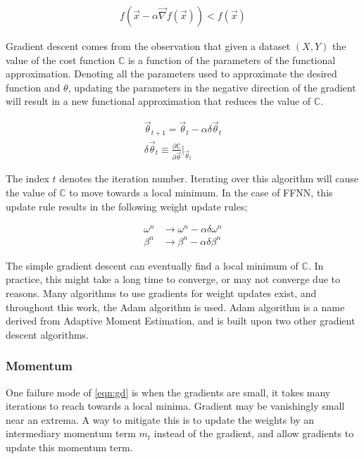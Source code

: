 \documentclass[../dissertation.tex]{subfiles}
\begin{document}
\begin{align}
    f\left(\vec{x} - \alpha \vec{\nabla} f(\vec{x}) \right) < f(\vec{x})
\end{align}

Gradient descent comes from the observation that given a dataset $(X, Y)$ the value of the cost function $\mathbb{C}$ is a function of the parameters of the functional approximation.
Denoting all the parameters used to approximate the desired function and $\theta$, updating the parameters in the negative direction of the gradient will result in a new functional approximation that reduces the value of $\mathbb{C}$.

\begin{align}
    \label{eqn:gd}
    \vec{\theta}_{t+1} = \vec{\theta}_t  - \alpha \delta \vec{\theta}_t \\
    \delta \vec{\theta}_t \equiv \frac{\partial \mathbb{C}}{\partial \vec{\theta}} \rvert_{\vec{\theta}_t}
\end{align}

The index $t$ denotes the iteration number. 
Iterating over this algorithm will cause the value of $\mathbb{C}$ to move towards a local minimum.
In the case of FFNN, this update rule results in the following weight update rules;

\begin{align}
    \label{eqn:basicgd}
    \omega^n    & \rightarrow \omega^n  - \alpha \delta \omega^n \\
    \beta^n     & \rightarrow \beta^n   - \alpha \delta \beta^n
\end{align}

The simple gradient descent can eventually find a local minimum of $\mathbb{C}$.
In practice, this might take a long time to converge, or may not converge due to reasons.
Many algorithms to use gradients for weight updates exist, and throughout this work, the Adam algorithm is used.
Adam algorithm is a name derived from Adaptive Moment Estimation, and is built upon two other gradient descent algorithms.

\subsubsection{Momentum}

One failure mode of \cref{eqn:gd} is when the gradients are small, it takes many iterations to reach towards a local minima.
Gradient may be vanishingly small near an extrema.
A way to mitigate this is to update the weights by an intermediary momentum term $m_t$ instead of the gradient, and allow gradients to update this momentum term.
\end{document}
